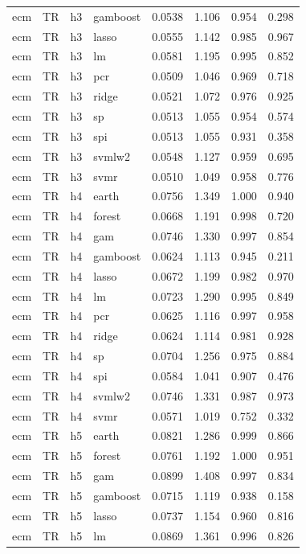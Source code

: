 \begin{ThreePartTable}
\begin{longtable}[t]{llclcccc}
ecm & TR & h3 & gamboost & 0.0538 & 1.106 & 0.954 & 0.298\\
ecm & TR & h3 & lasso & 0.0555 & 1.142 & 0.985 & 0.967\\
ecm & TR & h3 & lm & 0.0581 & 1.195 & 0.995 & 0.852\\
ecm & TR & h3 & pcr & 0.0509 & 1.046 & 0.969 & 0.718\\
ecm & TR & h3 & ridge & 0.0521 & 1.072 & 0.976 & 0.925\\
ecm & TR & h3 & sp & 0.0513 & 1.055 & 0.954 & 0.574\\
ecm & TR & h3 & spi & 0.0513 & 1.055 & 0.931 & 0.358\\
ecm & TR & h3 & svmlw2 & 0.0548 & 1.127 & 0.959 & 0.695\\
ecm & TR & h3 & svmr & 0.0510 & 1.049 & 0.958 & 0.776\\
\addlinespace
ecm & TR & h4 & earth & 0.0756 & 1.349 & 1.000 & 0.940\\
ecm & TR & h4 & forest & 0.0668 & 1.191 & 0.998 & 0.720\\
ecm & TR & h4 & gam & 0.0746 & 1.330 & 0.997 & 0.854\\
ecm & TR & h4 & gamboost & 0.0624 & 1.113 & 0.945 & 0.211\\
ecm & TR & h4 & lasso & 0.0672 & 1.199 & 0.982 & 0.970\\
ecm & TR & h4 & lm & 0.0723 & 1.290 & 0.995 & 0.849\\
ecm & TR & h4 & pcr & 0.0625 & 1.116 & 0.997 & 0.958\\
ecm & TR & h4 & ridge & 0.0624 & 1.114 & 0.981 & 0.928\\
ecm & TR & h4 & sp & 0.0704 & 1.256 & 0.975 & 0.884\\
ecm & TR & h4 & spi & 0.0584 & 1.041 & 0.907 & 0.476\\
ecm & TR & h4 & svmlw2 & 0.0746 & 1.331 & 0.987 & 0.973\\
ecm & TR & h4 & svmr & 0.0571 & 1.019 & 0.752 & 0.332\\
\addlinespace
ecm & TR & h5 & earth & 0.0821 & 1.286 & 0.999 & 0.866\\
ecm & TR & h5 & forest & 0.0761 & 1.192 & 1.000 & 0.951\\
ecm & TR & h5 & gam & 0.0899 & 1.408 & 0.997 & 0.834\\
ecm & TR & h5 & gamboost & 0.0715 & 1.119 & 0.938 & 0.158\\
ecm & TR & h5 & lasso & 0.0737 & 1.154 & 0.960 & 0.816\\
ecm & TR & h5 & lm & 0.0869 & 1.361 & 0.996 & 0.826\\

\end{longtable}
\end{ThreePartTable}
